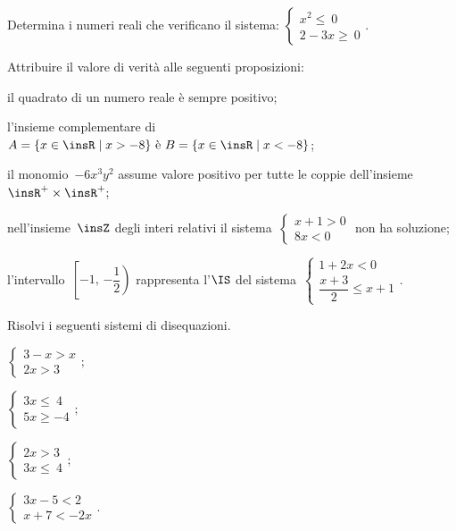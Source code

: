 \begin{esercizio}[\Ast]
 \label{ese:18.36}
 Determina i numeri reali che verificano il sistema:
 $\left\{%
  \begin{array}{l}
  x^{2}\le~0
  \\2-3x\ge~0
 \end{array}\right..$
 \end{esercizio}

\begin{esercizio}
 \label{ese:18.37}
 Attribuire il valore di verità alle seguenti proposizioni:

\begin{enumeratea}
\item il quadrato di un numero reale è sempre positivo;
\item l'insieme complementare di~$A=\{x\in\insR\;|\;x>-8\}\text{ è }B=\{x\in\insR \mid x<-8\}$;
\item il monomio~$-6x^{3}y^{2}$ assume valore positivo per tutte le coppie dell'insieme~$\insR^{+}\times\insR^{+}$;
\item nell'insieme~$\insZ$ degli interi relativi il sistema~$\left\{\begin{array}{l}x+1>0\\8x<0\end{array}\right.$ non ha soluzione;
\item l'intervallo~$\left[-1\text{,~}\left.-{\dfrac{1}{2}}\right)\right.$ rappresenta l'$\IS$ del sistema~$\left\{\begin{array}{l}1+2x<0 \\\dfrac{x+3}{2}\le x+1\end{array}\right.$.
\end{enumeratea}
\end{esercizio}

\begin{esercizio}[\Ast]
 \label{ese:18.38}
 Risolvi i seguenti sistemi di disequazioni.
 \begin{multicols}{2}
 \begin{enumeratea}
 \item $\left\{\begin{array}{l}
	3-x>x\\
	2x>3
	\end{array}\right.;$
\item $\left\{\begin{array}{l}
	3x\le~4\\
	5x\ge -4
   \end{array}\right.;$
\item $\left\{\begin{array}{l}
	2x>3\\
	3x\le~4
	\end{array}\right.;$
\item $\left\{\begin{array}{l}
	3x-5<2\\
	x+7<-2x
   \end{array}\right..$
 \end{enumeratea}
\end{multicols}
\end{esercizio}

